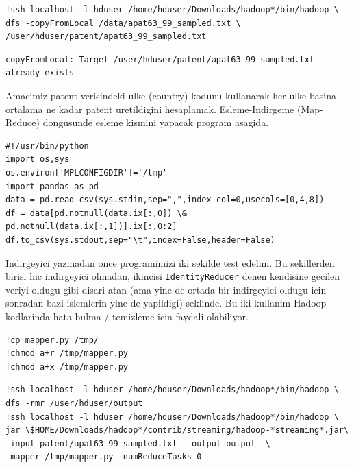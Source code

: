 \documentclass[12pt,fleqn]{article}\usepackage{../common}
\begin{document}
\begin{verbatim}
!ssh localhost -l hduser /home/hduser/Downloads/hadoop*/bin/hadoop \
dfs -copyFromLocal /data/apat63_99_sampled.txt \
/user/hduser/patent/apat63_99_sampled.txt
\end{verbatim}

\begin{verbatim}
copyFromLocal: Target /user/hduser/patent/apat63_99_sampled.txt already exists
\end{verbatim}

Amacimiz patent verisindeki ulke (country) kodunu kullanarak her ulke
basina ortalama ne kadar patent uretildigini
hesaplamak. Esleme-Indirgeme (Map-Reduce) dongusunde esleme kismini
yapacak program asagida.

\begin{verbatim}
#!/usr/bin/python
import os,sys
os.environ['MPLCONFIGDIR']='/tmp' 
import pandas as pd
data = pd.read_csv(sys.stdin,sep=",",index_col=0,usecols=[0,4,8])
df = data[pd.notnull(data.ix[:,0]) \& pd.notnull(data.ix[:,1])].ix[:,0:2]
df.to_csv(sys.stdout,sep="\t",index=False,header=False)
\end{verbatim}

Indirgeyici yazmadan once programimizi iki sekilde test edelim. Bu
sekillerden birisi hic indirgeyici olmadan, ikincisi
\verb!IdentityReducer! denen kendisine gecilen veriyi oldugu
gibi disari atan (ama yine de ortada bir indirgeyici oldugu icin
sonradan bazi islemlerin yine de yapildigi) seklinde. Bu iki kullanim
Hadoop kodlarinda hata bulma / temizleme icin faydali olabiliyor.

\begin{verbatim}
!cp mapper.py /tmp/
!chmod a+r /tmp/mapper.py
!chmod a+x /tmp/mapper.py
\end{verbatim}

\begin{verbatim}
!ssh localhost -l hduser /home/hduser/Downloads/hadoop*/bin/hadoop \
dfs -rmr /user/hduser/output
!ssh localhost -l hduser /home/hduser/Downloads/hadoop*/bin/hadoop \
jar \$HOME/Downloads/hadoop*/contrib/streaming/hadoop-*streaming*.jar\
-input patent/apat63_99_sampled.txt  -output output  \
-mapper /tmp/mapper.py -numReduceTasks 0 
\end{verbatim}
\end{document}

